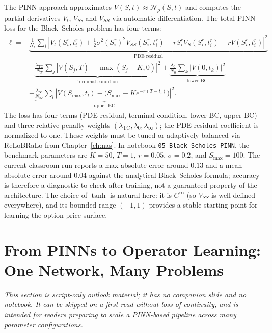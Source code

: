 \documentclass[11pt,a4paper]{report}
\begin{document}
The PINN approach approximates $V(S,t) \approx \mathcal{N}_\rho(S,t)$ and computes the partial derivatives $V_t$, $V_S$, and $V_{SS}$ via automatic differentiation.  The total PINN loss for the Black--Scholes problem has four terms:
\begin{equation}
\begin{aligned}
\ell ={}& \underbrace{\frac{1}{N_r}\sum_i
\left|V_t(S_i^r,t_i^r) + \tfrac{1}{2}\sigma^2 (S_i^r)^2 V_{SS}(S_i^r,t_i^r)
+ rS_i^r V_S(S_i^r,t_i^r) - rV(S_i^r,t_i^r)\right|^2}_{\text{PDE residual}} \\
&+ \underbrace{\frac{\lambda_\mathrm{TC}}{N_T}\sum_j \left|V(S_j,T) - \max(S_j-K,0)\right|^2}_{\text{terminal condition}}
+ \underbrace{\frac{\lambda_0}{N_0}\sum_k \left|V(0,t_k)\right|^2}_{\text{lower BC}} \\
&+ \underbrace{\frac{\lambda_\infty}{N_\infty}\sum_l
\left|V(S_\mathrm{max},t_l) - \bigl(S_\mathrm{max}-Ke^{-r(T-t_l)}\bigr)\right|^2}_{\text{upper BC}} .
\end{aligned}
\end{equation}
The loss has four terms (PDE residual, terminal condition, lower BC, upper BC) and three relative penalty weights $(\lambda_\mathrm{TC}, \lambda_0, \lambda_\infty)$; the PDE residual coefficient is normalized to one.  These weights must be tuned or adaptively balanced via ReLoBRaLo from Chapter~\ref{ch:nas}.  In notebook \texttt{05\_Black\_Scholes\_PINN}, the benchmark parameters are $K=50$, $T=1$, $r=0.05$, $\sigma=0.2$, and $S_\mathrm{max}=100$.  The current classroom run reports a max absolute error around $0.13$ and a mean absolute error around $0.04$ against the analytical Black--Scholes formula; accuracy is therefore a diagnostic to check after training, not a guaranteed property of the architecture.  The choice of $\tanh$ is natural here: it is $C^\infty$ (so $V_{SS}$ is well-defined everywhere), and its bounded range $(-1,1)$ provides a stable starting point for learning the option price surface.

\section{From PINNs to Operator Learning: One Network, Many Problems}
\label{sec:operator_learning_bridge}

\noindent\emph{This section is script-only outlook material; it has no companion slide and no notebook.  It can be skipped on a first read without loss of continuity, and is intended for readers preparing to scale a PINN-based pipeline across many parameter configurations.}
\end{document}
